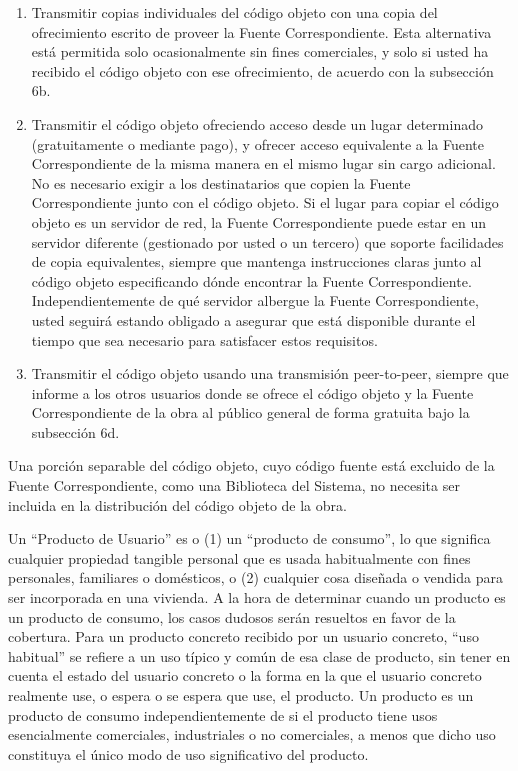 \documentclass[11pt]{article}
\begin{document}
\begin{enumerate}
\begin{enumerate}
  \item Transmitir copias individuales del c\'{o}digo objeto con una copia 
    del ofrecimiento escrito de proveer la Fuente Correspondiente.  Esta 
    alternativa est\'{a} permitida solo ocasionalmente sin fines comerciales, 
    y solo si usted ha recibido el c\'{o}digo objeto con ese ofrecimiento, 
    de acuerdo con la subsecci\'{o}n 6b.

  \item Transmitir el c\'{o}digo objeto ofreciendo acceso desde un lugar 
    determinado (gratuitamente o mediante pago), y ofrecer acceso 
    equivalente a la Fuente Correspondiente de la misma manera en el 
    mismo lugar sin cargo adicional. No es necesario exigir a los 
    destinatarios que copien la Fuente Correspondiente junto con el 
    c\'{o}digo objeto.  Si el lugar para copiar el c\'{o}digo objeto es un 
    servidor de red, la Fuente Correspondiente puede estar en un 
    servidor diferente (gestionado por usted o un tercero) que soporte 
    facilidades de copia equivalentes, siempre que mantenga 
    instrucciones claras junto al c\'{o}digo objeto especificando d\'{o}nde 
    encontrar la Fuente Correspondiente. Independientemente de qu\'{e} 
    servidor albergue la Fuente Correspondiente, usted seguir\'{a} estando 
    obligado a asegurar que est\'{a} disponible durante el tiempo que 
    sea necesario para satisfacer estos requisitos.

  \item Transmitir el c\'{o}digo objeto usando una transmisi\'{o}n peer-to-peer, 
    siempre que informe a los otros usuarios donde se ofrece el c\'{o}digo 
    objeto y la Fuente Correspondiente de la obra al p\'{u}blico general de 
    forma gratuita bajo la subsecci\'{o}n 6d.
  \end{enumerate}

Una porci\'{o}n separable del c\'{o}digo objeto, cuyo c\'{o}digo fuente est\'{a} 
excluido de la Fuente Correspondiente, como una Biblioteca del Sistema, 
no necesita ser incluida en la distribuci\'{o}n del c\'{o}digo objeto de la obra.

Un ``Producto de Usuario'' es o (1) un ``producto de consumo'', lo que 
significa cualquier propiedad tangible personal que es usada 
habitualmente con fines personales, familiares o dom\'{e}sticos, o (2) 
cualquier cosa dise\~nada o vendida para ser incorporada en una vivienda.  
A la hora de determinar cuando un producto es un producto de consumo, 
los casos dudosos ser\'{a}n resueltos en favor de la cobertura.  Para un 
producto concreto recibido por un usuario concreto, ``uso habitual'' se 
refiere a un uso t\'{i}pico y com\'{u}n de esa clase de producto, sin tener en 
cuenta el estado del usuario concreto o la forma en la que el usuario 
concreto realmente use, o espera o se espera que use, el producto.  Un 
producto es un producto de consumo independientemente de si el producto 
tiene usos esencialmente comerciales, industriales o no comerciales, a 
menos que dicho uso constituya el \'{u}nico modo de uso significativo del 
producto.


\end{enumerate}
\end{document}
